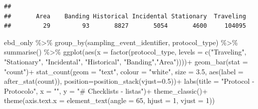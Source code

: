 \documentclass[
]{article}
\newenvironment{Shaded}{\begin{snugshade}}{\end{snugshade}}
\newcommand{\AttributeTok}[1]{\textcolor[rgb]{0.77,0.63,0.00}{#1}}
\newcommand{\CommentTok}[1]{\textcolor[rgb]{0.56,0.35,0.01}{\textit{#1}}}
\newcommand{\DecValTok}[1]{\textcolor[rgb]{0.00,0.00,0.81}{#1}}
\newcommand{\FloatTok}[1]{\textcolor[rgb]{0.00,0.00,0.81}{#1}}
\newcommand{\FunctionTok}[1]{\textcolor[rgb]{0.00,0.00,0.00}{#1}}
\newcommand{\NormalTok}[1]{#1}
\newcommand{\SpecialCharTok}[1]{\textcolor[rgb]{0.00,0.00,0.00}{#1}}
\newcommand{\StringTok}[1]{\textcolor[rgb]{0.31,0.60,0.02}{#1}}
\begin{document}
\begin{Shaded}
\end{Shaded}

\begin{verbatim}
## 
##       Area    Banding Historical Incidental Stationary  Traveling 
##         29         93       8827       5054       4600     104095
\end{verbatim}

\begin{Shaded}
\begin{Highlighting}[]
\NormalTok{ebd\_only }\SpecialCharTok{\%\textgreater{}\%}
  \FunctionTok{group\_by}\NormalTok{(sampling\_event\_identifier, protocol\_type) }\SpecialCharTok{\%\textgreater{}\%} 
  \FunctionTok{summarise}\NormalTok{() }\SpecialCharTok{\%\textgreater{}\%} 
  \FunctionTok{ggplot}\NormalTok{(}\FunctionTok{aes}\NormalTok{(}\AttributeTok{x =} \FunctionTok{factor}\NormalTok{(protocol\_type, }
                        \AttributeTok{levels =} \FunctionTok{c}\NormalTok{(}\StringTok{"Traveling"}\NormalTok{,}
                                   \StringTok{"Stationary"}\NormalTok{,}
                                   \StringTok{"Incidental"}\NormalTok{,}
                                   \StringTok{"Historical"}\NormalTok{,}
                                   \StringTok{"Banding"}\NormalTok{,}\StringTok{"Area"}\NormalTok{))))}\SpecialCharTok{+}
    \FunctionTok{geom\_bar}\NormalTok{(}\AttributeTok{stat =} \StringTok{"count"}\NormalTok{)}\SpecialCharTok{+}
    \FunctionTok{stat\_count}\NormalTok{(}\AttributeTok{geom =} \StringTok{"text"}\NormalTok{, }\AttributeTok{colour =} \StringTok{"white"}\NormalTok{, }\AttributeTok{size =} \FloatTok{3.5}\NormalTok{,}
               \FunctionTok{aes}\NormalTok{(}\AttributeTok{label =} \FunctionTok{after\_stat}\NormalTok{(count)), }\AttributeTok{position=}\FunctionTok{position\_stack}\NormalTok{(}\AttributeTok{vjust=}\FloatTok{0.5}\NormalTok{))}\SpecialCharTok{+}
  \FunctionTok{labs}\NormalTok{(}\AttributeTok{title =} \StringTok{"Protocol {-} Protocolo"}\NormalTok{,}
       \AttributeTok{x =} \StringTok{""}\NormalTok{,}
       \AttributeTok{y =} \StringTok{"\# Checklists {-} listas"}\NormalTok{)}\SpecialCharTok{+}
  \FunctionTok{theme\_classic}\NormalTok{()}\SpecialCharTok{+}
  \FunctionTok{theme}\NormalTok{(}\AttributeTok{axis.text.x =} \FunctionTok{element\_text}\NormalTok{(}\AttributeTok{angle =} \DecValTok{65}\NormalTok{, }\AttributeTok{hjust =} \DecValTok{1}\NormalTok{, }\AttributeTok{vjust =} \DecValTok{1}\NormalTok{))}
\end{Highlighting}
\end{Shaded}
\end{document}
